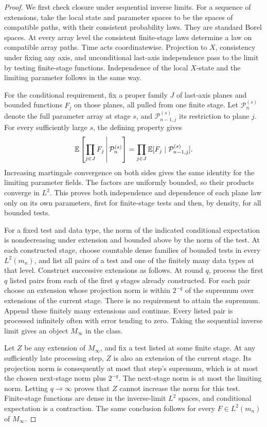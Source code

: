 \begin{proof}
We first check closure under sequential inverse limits.  For a sequence
of extensions, take the local state and parameter spaces to be the
spaces of compatible paths, with their consistent probability laws.
They are standard Borel spaces.  At every array level the consistent
finite-stage laws determine a law on compatible array paths.  Time acts
coordinatewise.  Projection to $X$, consistency under fixing any axis,
and unconditional last-axis independence pass to the limit by testing
finite-stage functions.  Independence of the local $X$-state and the
limiting parameter follows in the same way.

For the conditional requirement, fix a proper family $J$ of last-axis
planes and bounded functions $F_j$ on those planes, all pulled from one
finite stage.  Let $\mathcal P_n^{(s)}$ denote the full parameter array
at stage $s$, and $\mathcal P_{n-1,j}^{(s)}$ its restriction to plane $j$.
For every sufficiently large $s$, the defining property gives
\[
 \mathbb E\left[\prod_{j\in J}F_j\,\middle|\,\mathcal P_n^{(s)}\right]
 =\prod_{j\in J}\mathbb E[F_j\mid\mathcal P_{n-1,j}^{(s)}].
\]
Increasing martingale convergence on both sides gives the same identity
for the limiting parameter fields.  The factors are uniformly bounded,
so their products converge in $L^2$.  This proves both independence
and dependence of each plane law only on its own parameters, first for
finite-stage tests and then, by density, for all bounded tests.

For a fixed test and data type, the norm of the indicated conditional
expectation is nondecreasing under extension and bounded above by the
norm of the test.  At each constructed stage, choose countable dense
families of bounded tests in every $L^2(m_n)$, and list all pairs of a
test and one of the finitely many data types at that level.  Construct
successive extensions as follows.  At round $q$, process the first $q$
listed pairs from each of the first $q$ stages already constructed.
For each pair choose an extension whose projection norm is within
$2^{-q}$ of the supremum over extensions of the current stage.
There is no requirement to attain the supremum.  Append these finitely
many extensions and continue.  Every listed pair is processed
infinitely often with error tending to zero.  Taking the sequential
inverse limit gives an object $M_\infty$ in the class.

Let $Z$ be any extension of $M_\infty$, and fix a test listed at some
finite stage.  At any sufficiently late processing step, $Z$ is also an
extension of the current stage.  Its projection norm is consequently
at most that step's supremum, which is at most the chosen next-stage
norm plus $2^{-q}$.  The next-stage norm is at most the limiting norm.
Letting $q\to\infty$ proves that $Z$ cannot increase the norm for this
test.  Finite-stage functions are dense in the inverse-limit
$L^2$ spaces, and conditional expectation is a contraction.  The same
conclusion follows for every $F\in L^2(m_n)$ of $M_\infty$.


\end{proof}
